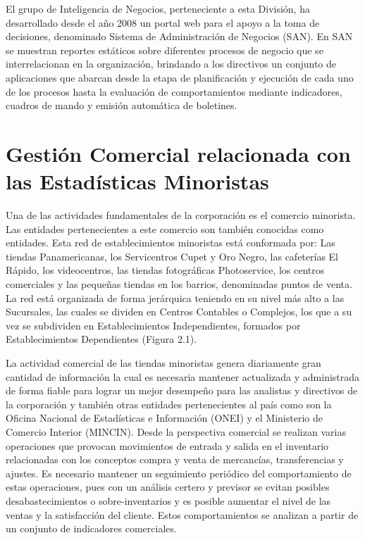 El grupo de Inteligencia de Negocios, perteneciente a esta División, ha desarrollado desde el año 2008 un portal web para el apoyo a la toma de decisiones, denominado Sistema de Administración de Negocios (SAN). En SAN se muestran reportes estáticos sobre diferentes procesos de negocio que se interrelacionan en la organización, brindando a los directivos un conjunto de aplicaciones que abarcan desde la etapa de planificación y ejecución de cada uno de los procesos hasta la evaluación de comportamientos mediante indicadores, cuadros de mando y emisión automática de boletines.



\section*{Gestión Comercial relacionada con las Estadísticas Minoristas}\label{gestion_comercial}
Una de las actividades fundamentales de la corporación es el comercio minorista. Las entidades pertenecientes a este comercio son también conocidas como entidades. Esta red de establecimientos  minoristas está conformada por: Las tiendas Panamericanas, los Servicentros Cupet y Oro Negro, las cafeterías El Rápido, los videocentros, las tiendas fotográficas Photoservice, los centros comerciales y las pequeñas tiendas en los barrios, denominadas puntos de venta.\\

La red está organizada de forma jerárquica teniendo en su nivel más alto a las Sucursales, las cuales se dividen en Centros Contables o Complejos, los que a su vez se subdividen en Establecimientos Independientes, formados por Establecimientos Dependientes (Figura 2.1).


La actividad comercial de las tiendas minoristas genera diariamente gran cantidad de información la cual es necesaria mantener actualizada y administrada de forma fiable para lograr un mejor desempeño para las analistas y directivos de la corporación y también otras entidades pertenecientes al país como son la Oficina Nacional de Estadísticas e Información (ONEI) y el Ministerio de Comercio Interior (MINCIN). Desde la perspectiva comercial se realizan varias operaciones que provocan movimientos de entrada y salida en el inventario relacionadas con los conceptos compra y venta de mercancías, transferencias y ajustes. Es necesario mantener un seguimiento periódico del comportamiento de estas operaciones, pues con un análisis certero y previsor se evitan posibles desabastecimientos o sobre-inventarios y es posible aumentar el nivel de las ventas y la satisfacción del cliente. Estos comportamientos se analizan a partir de un conjunto de indicadores comerciales.


